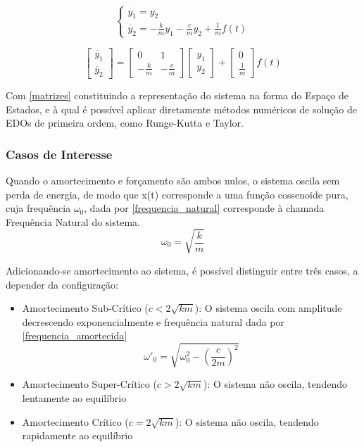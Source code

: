 \documentclass[12pt,a4paper]{article}
\begin{document}
\begin{equation}
    \label{sistema}
    \begin{cases}
        \dot{y_1} = y_2 \\
        \dot{y_2} = -\frac{k}{m}y_1 - \frac{c}{m}y_2 + \frac{1}{m}f(t)
    \end{cases}
\end{equation}

\begin{equation}
    \label{matrizes}
    \begin{bmatrix}
        \dot{y_1}\\
        \dot{y_2}
    \end{bmatrix} =\begin{bmatrix}
        0 & 1 \\
        -\frac{k}{m} & -\frac{c}{m}
    \end{bmatrix}\begin{bmatrix}
        {y_1}\\
        {y_2}
    \end{bmatrix} + \begin{bmatrix}
        0  \\
        \frac{1}{m}
    \end{bmatrix}f(t)
\end{equation}

\par Com \eqref{matrizes} constituindo a representação do sistema na forma do Espaço de Estados, e à qual é possível aplicar diretamente métodos numéricos de solução de EDOs de primeira ordem, como Runge-Kutta e Taylor.
\subsubsection{Casos de Interesse}
\par Quando o amortecimento e forçamento são ambos nulos, o sistema oscila sem perda de energia, de modo que x(t) corresponde a uma função cossenoide pura, cuja frequência $\omega_0$, dada por \eqref{frequencia_natural} corresponde à chamada Frequência Natural do sistema.
\begin{equation}
    \label{frequencia_natural}
    \omega_0 = \sqrt{\frac{k}{m}}
\end{equation}

\par Adicionando-se amortecimento ao sistema, é possível distinguir entre três casos, a depender da configuração:
\begin{itemize}
  \item Amortecimento Sub-Crítico ($c<2\sqrt{km}$): O sistema oscila com amplitude decrescendo exponencialmente e frequência natural dada por \eqref{frequencia_amortecida}
  \begin{equation}
      \label{frequencia_amortecida}
      \omega'_{0} = \sqrt{\omega_0^2 - \left(\frac{c}{2m}\right)^2}
  \end{equation}
  \item Amortecimento Super-Crítico ($c>2\sqrt{km}$): O sistema não oscila, tendendo lentamente ao equilíbrio
  \item Amortecimento Crítico ($c=2\sqrt{km}$): O sistema não oscila, tendendo rapidamente ao equilíbrio
\end{itemize}
\end{document}
